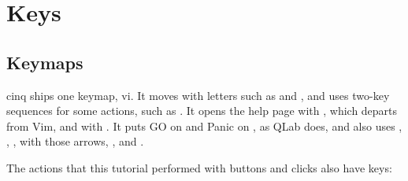%

\chapter{Keys}
\label{ch:keys}

\section{Keymaps}

cinq ships one keymap, vi.  It moves with letters such as  and
, and uses two-key sequences for some actions, such as .  It
opens the help page with , which departs from Vim, and with .
It puts GO on  and Panic on , as QLab does, and also
uses , , ,  with those
arrows, , and .

The actions that this tutorial performed with buttons and clicks also have
keys:

